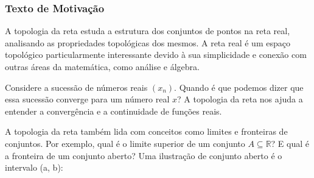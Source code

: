\documentclass{article}
\begin{document}
\subsubsection{Texto de Motiva\c c\~ao}
A topologia da reta estuda a estrutura dos conjuntos de pontos na reta real, analisando as propriedades topológicas dos mesmos. A reta real é um espaço topológico particularmente interessante devido à sua simplicidade e conexão com outras áreas da matemática, como análise e álgebra.

Considere a sucessão de números reais $(x_n)$. Quando é que podemos dizer que essa sucessão converge para um número real $x$? A topologia da reta nos ajuda a entender a convergência e a continuidade de funções reais.

\begin{center}
\end{center}

A topologia da reta também lida com conceitos como limites e fronteiras de conjuntos. Por exemplo, qual é o limite superior de um conjunto $A \subseteq \mathbb{R}$? E qual é a fronteira de um conjunto aberto?
Uma ilustra\c c\~ao de conjunto aberto \'e o intervalo (a, b):

\begin{center}
\end{center}
\end{document}
